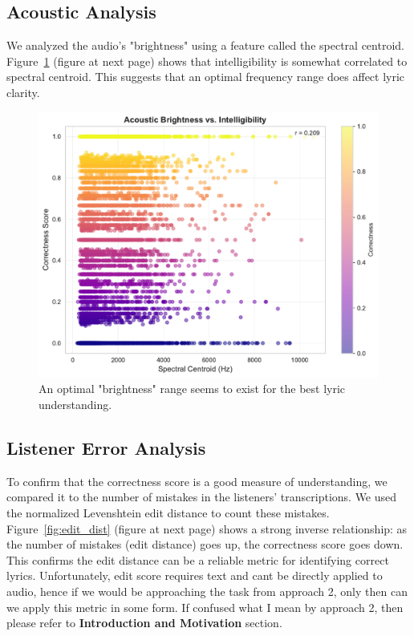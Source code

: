 \documentclass[conference]{IEEEtran}
\begin{document}
\subsection{Acoustic Analysis}
We analyzed the audio's "brightness" using a feature called the spectral centroid. Figure~\ref{fig:spectral} (figure at next page) shows that intelligibility is somewhat correlated to spectral centroid. This suggests that an optimal frequency range does affect lyric clarity.

\begin{figure}[htbp]
    \centering
    \includegraphics[width=\columnwidth]{plots/figure_5_spectral_centroid.pdf}
    \caption{An optimal "brightness" range seems to exist for the best lyric understanding.}
    \label{fig:spectral}
\end{figure}

\subsection{Listener Error Analysis}
To confirm that the correctness score is a good measure of understanding, we compared it to the number of mistakes in the listeners' transcriptions. We used the normalized Levenshtein edit distance to count these mistakes. Figure~\ref{fig:edit_dist} (figure at next page) shows a strong inverse relationship: as the number of mistakes (edit distance) goes up, the correctness score goes down. This confirms the edit distance can be a reliable metric for identifying correct lyrics. Unfortunately, edit score requires text and cant be directly applied to audio, hence if we would be approaching the task from approach 2, only then can we apply this metric in some form. If confused what I mean by approach 2, then please refer to \textbf{Introduction and Motivation} section.
\end{document}
